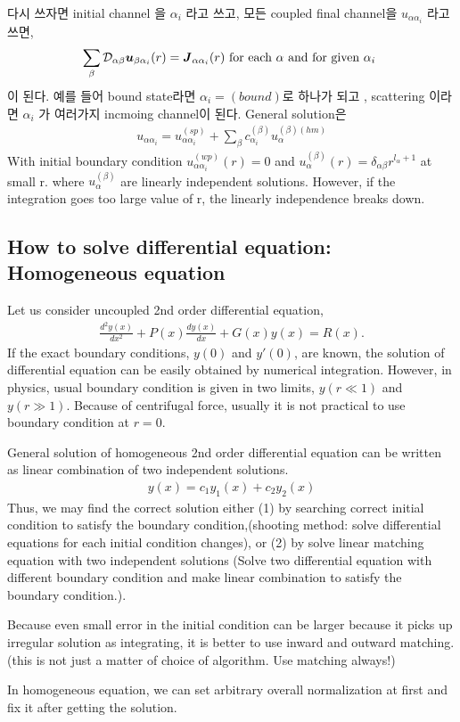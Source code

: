\documentclass[10pt]{article}
\def\bm{\boldsymbol}
\newcommand{\bea}{\begin{eqnarray}}
\newcommand{\eea}{\end{eqnarray}}
\begin{document}
다시 쓰자면 initial channel 을 $\alpha_i$ 라고 쓰고, 모든 
coupled final channel을 $u_{\alpha\alpha_i}$ 라고 쓰면, 
\bea 
\sum_{\beta}{\cal D}_{\alpha\beta}{\bm u}_{\beta\alpha_i}(r)={\bm J}_{\alpha\alpha_i}(r) 
\mbox{ for each $\alpha$ and for given $\alpha_i$ }
\eea  
이 된다. 예를 들어 bound state라면 $\alpha_i=(bound)$로 하나가 되고 , scattering 이라면 
$\alpha_i$ 가 여러가지 incmoing channel이 된다. 
General solution은 
\bea 
u_{\alpha\alpha_i}=u_{\alpha\alpha_i}^{(sp)}
      +\sum_{\beta} c_{\alpha_i}^{(\beta)} u_{\alpha}^{(\beta)(hm)}
\eea 
With initial boundary condition 
$u_{\alpha\alpha_i}^{(wp)}(r)=0 $ and
$u_{\alpha}^{(\beta)}(r)=\delta_{\alpha\beta} r^{l_\alpha+1}$ at small r.
where $u_\alpha^{(\beta)}$ are linearly independent solutions.  However, 
if the integration goes too large value of r, the linearly independence breaks down. 

\subsection{How to solve differential equation: Homogeneous equation }
Let us consider uncoupled 2nd order differential equation,
\bea 
\frac{d^2 y(x)}{dx^2}+P(x)\frac{d y(x)}{dx}+G(x)y(x)=R(x).
\eea 
If the exact boundary conditions, $y(0)$ and $y'(0)$, are known,
the solution of differential equation can be easily obtained by 
numerical integration. However, in physics, usual boundary condition is 
given in two limits, $y(r\ll 1)$ and $y(r\gg 1)$. Because of centrifugal
force, usually it is not practical to use  boundary condition at $r=0$.

General solution of homogeneous 2nd order differential equation can be written 
as linear combination of two independent solutions.
\bea 
y(x)=c_1 y_1(x) +c_2 y_2(x)
\eea 
Thus, we may find the correct solution either 
(1) by searching correct initial condition to satisfy
the boundary condition,(shooting method:
solve differential equations for each initial condition changes),
or (2) by solve linear matching equation with two independent solutions
(Solve two differential equation with different boundary condition 
and make linear combination to satisfy the boundary condition.). 

Because even small error in the initial condition can be larger 
because it picks up irregular solution as integrating, 
it is better to use inward and outward matching. 
(this is not just a matter of choice of algorithm. Use matching always!)

In homogeneous equation, we can set arbitrary overall normalization at first 
and fix it after getting the solution.
\end{document}
